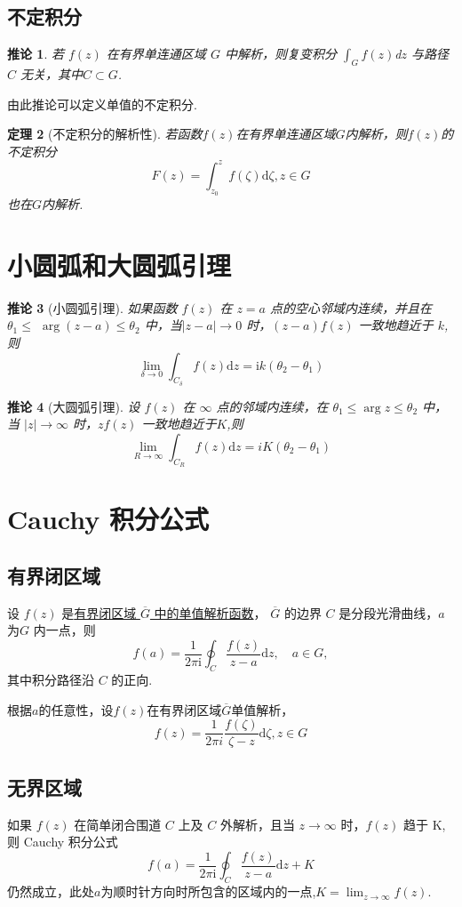 \documentclass[11pt, a4paper, twoside]{ctexbook}
\newtheorem{theorem}{定理}[section]
\newtheorem{corollary}[theorem]{推论}
\begin{document}
\subsection{不定积分}
\begin{corollary}
    若 $f(z)$ 在有界单连通区域 $G$ 中解析，则复变积分 $\int _Gf( z) $d$z$ 与路径 $C$ 无关，其中$C\subset G$.
\end{corollary}
由此推论可以定义单值的不定积分.
\begin{theorem}[不定积分的解析性]
    若函数$f(z)$在有界单连通区域$G$内解析，则$f(z)$的不定积分
    $$F(z) = \int_{z_0}^zf(\zeta)\mathrm{d}\zeta, z\in G$$
    也在$G$内解析.
\end{theorem}
\section{小圆弧和大圆弧引理}
\begin{corollary}[小圆弧引理]
    如果函数 $f(z)$ 在 $z=a$ 点的空心邻域内连续，并且在 $\theta_1\leqslant$
    $\arg(z-a)\leqslant\theta_2$ 中，当$|z-a|\to0$ 时，$(z-a)f(z)$ 一致地趋近于 $k$,则
    $$\boxed{\lim_{\delta\to0}\int_{C_\delta}f(z)\mathrm{d}z=\mathrm{i}k(\theta_2-\theta_1)}$$
\end{corollary}
\begin{corollary}[大圆弧引理]
    设 $f(z)$ 在 $\infty$ 点的邻域内连续，在 $\theta_1\leqslant\arg z\leqslant\theta_2$ 中，当 $|z|\to\infty$ 时，$zf(z)$ 一致地趋近于$K$,则
    $$\lim_{R\to \infty} \int _{C_R} f(z)\mathrm{d}z = iK(\theta_2-\theta_1)$$
\end{corollary}
\section{Cauchy 积分公式}
\subsection{有界闭区域}
设 $f(z)$ 是\underline{有界闭区域 $\overline{G}$ 中的单值解析函数}，
$\overline{G}$ 的边界 $C$ 是分段光滑曲线，$a$ 为$G$ 内一点，则
$$\boxed{f(a)=\frac{1}{2\pi\mathrm{i}}\oint_C\frac{f(z)}{z-a}\mathrm{d}z,\quad a\in G},$$
其中积分路径沿 $C$ 的正向.

根据$a$的任意性，设$f(z)$在有界闭区域$\overline{G}$单值解析，$$f(z) = \frac{1}{2\pi i} \frac{f(\zeta)}{\zeta - z} \mathrm{d}\zeta,z\in G$$
\subsection{无界区域}
如果 $f(z)$ 在简单闭合围道 $C$ 上及 $C$ 外解析，且当 $z\to\infty$ 时，$f(z)$ 趋于 K,则 Cauchy 积分公式
$$
f(a)=\frac{1}{2\pi\mathrm{i}}\oint_C\frac{f(z)}{z-a}\mathrm{d}z+K
$$
仍然成立，此处$a$为顺时针方向时所包含的区域内的一点,$K = \lim_{z\to \infty}f(z)$. 
\end{document}
